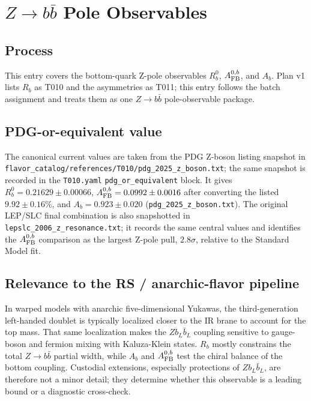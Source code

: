 
\section{\texorpdfstring{\(Z \to b\bar b\) Pole Observables}{Z to b bbar Pole Observables}}

\subsection*{Process}
This entry covers the bottom-quark Z-pole observables \(R_b^0\),
\(A_{\rm FB}^{0,b}\), and \(A_b\).  Plan v1 lists \(R_b\) as T010 and the
asymmetries as T011; this entry follows the batch assignment and treats them as
one \(Z\to b\bar b\) pole-observable package.

\subsection*{PDG-or-equivalent value}
The canonical current values are taken from the PDG Z-boson listing snapshot in
\texttt{flavor\_catalog/references/T010/pdg\_2025\_z\_boson.txt}; the same
snapshot is recorded in the \texttt{T010.yaml} \texttt{pdg\_or\_equivalent}
block.  It gives \(R_b^0=0.21629\pm0.00066\),
\(A_{\rm FB}^{0,b}=0.0992\pm0.0016\) after converting the listed
\(9.92\pm0.16\%\), and \(A_b=0.923\pm0.020\)
(\texttt{pdg\_2025\_z\_boson.txt}).  The original LEP/SLC final combination is
also snapshotted in \texttt{lepslc\_2006\_z\_resonance.txt}; it records the
same central values and identifies the \(A_{\rm FB}^{0,b}\) comparison as the
largest Z-pole pull, \(2.8\sigma\), relative to the Standard Model fit.

\subsection*{Relevance to the RS / anarchic-flavor pipeline}
In warped models with anarchic five-dimensional Yukawas, the third-generation
left-handed doublet is typically localized closer to the IR brane to account
for the top mass.  That same localization makes the \(Z b_L\bar b_L\) coupling
sensitive to gauge-boson and fermion mixing with Kaluza-Klein states.  \(R_b\)
mostly constrains the total \(Z\to b\bar b\) partial width, while \(A_b\) and
\(A_{\rm FB}^{0,b}\) test the chiral balance of the bottom coupling.  Custodial
extensions, especially protections of \(Z b_L\bar b_L\), are therefore not a
minor detail; they determine whether this observable is a leading bound or a
diagnostic cross-check.

